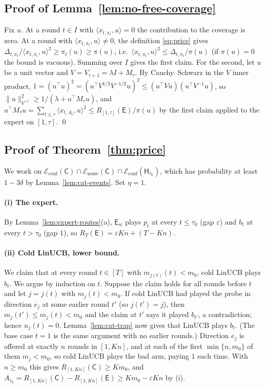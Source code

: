 \documentclass{article}
\theoremstyle{definition}
\theoremstyle{remark}
\newcommand{\eps}{\varepsilon}
\theoremstyle{remark}
\newcommand{\Cold}{\mathsf{C}}
\newcommand{\Exp}{\mathsf{E}}
\newcommand{\Hyb}{\mathsf{H}}
\begin{document}
\subsection{Proof of Lemma~\ref{lem:no-free-coverage}}

Fix $u$. At a round $t\in I$ with $\langle x_{t,\pi_t},u\rangle=0$ the
contribution to the coverage is zero. At a round with
$\langle x_{t,\pi_t},u\rangle\ne0$, the definition \eqref{eq:price} gives
$\Delta_{t,\pi_t}/\langle x_{t,\pi_t},u\rangle^2\ge\pi_t(u)\ge\pi(u)$, i.e.\
$\langle x_{t,\pi_t},u\rangle^2\le\Delta_{t,\pi_t}/\pi(u)$ (if $\pi(u)=0$ the bound
is vacuous). Summing over $I$ gives the first claim. For the second, let
$u$ be a unit vector and $V=V_{\tau+1}=\lambda I+M_\tau$. By Cauchy--Schwarz in
the $V$ inner product,
$1=(u^\top u)^2=(u^\top V^{1/2}V^{-1/2}u)^2\le(u^\top Vu)(u^\top V^{-1}u)$, so
$\|u\|^2_{V^{-1}}\ge1/(\lambda+u^\top M_\tau u)$, and
$u^\top M_\tau u=\sum_{t\le\tau}\langle x_{t,A_t},u\rangle^2\le R_{[1,\tau]}(\Exp)/\pi(u)$
by the first claim applied to the expert on $[1,\tau]$. \qed

\subsection{Proof of Theorem~\ref{thm:price}}

We work on $\mathcal E_{\mathrm{conf}}(\Cold)\cap\mathcal E_{\mathrm{noise}}(\Cold)\cap\mathcal E_{\mathrm{conf}}(\Hyb_{\tau_0})$,
which has probability at least $1-3\delta$ by Lemma~\ref{lem:cat-events}. Set
$\eta=1$.

\paragraph{(i) The expert.}
By Lemma~\ref{lem:expert-routes}(a), $\Exp_w$ plays $p_t$ at every $t\le\tau_0$
(gap $\eps$) and $b_t$ at every $t>\tau_0$ (gap $1$), so $R_T(\Exp)=\eps Kn+(T-Kn)$.

\paragraph{(ii) Cold LinUCB, lower bound.}
We claim that at every round $t\in[T]$ with $m_{j(t)}(t)<m_0$, cold LinUCB
plays $b_t$. We argue by induction on $t$. Suppose the claim holds for all
rounds before $t$ and let $j=j(t)$ with $m_j(t)<m_0$. If cold LinUCB had
played the probe in direction $e_j$ at some earlier round $t'$ (so $j(t')=j$),
then $m_j(t')\le m_j(t)<m_0$ and the claim at $t'$ says it played $b_{t'}$,
a contradiction; hence $n_j(t)=0$. Lemma~\ref{lem:cat-trap} now gives that
LinUCB plays $b_t$. (The base case $t=1$ is the same argument with no earlier
rounds.) Direction $e_j$ is offered at exactly $n$ rounds in $[1,Kn]$, and at
each of the first $\min\{n,m_0\}$ of them $m_j<m_0$, so cold LinUCB plays the
bad arm, paying $1$ each time. With $n\ge m_0$ this gives $R_{[1,Kn]}(\Cold)\ge Km_0$,
and $A_{\tau_0}=R_{[1,Kn]}(\Cold)-R_{[1,Kn]}(\Exp)\ge Km_0-\eps Kn$ by (i).
\end{document}
